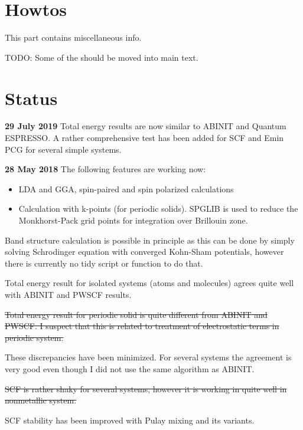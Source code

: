 \documentclass[a4paper,10pt,fleqn]{article}
\begin{document}


















\appendix
\section{Howtos}

This part contains miscellaneous info.

TODO: Some of the should be moved into main text.




\section*{Status}

\textbf{29 July 2019} Total energy results are now similar to ABINIT
and Quantum ESPRESSO. A rather comprehensive test has been added
for SCF and Emin PCG for several simple systems.


\textbf{28 May 2018} The following features are working now:
\begin{itemize}
\item LDA and GGA, spin-paired and spin polarized calculations
\item Calculation with k-points (for periodic solids).
  \textsf{SPGLIB} is used to reduce the Monkhorst-Pack grid points
  for integration over Brillouin zone.
\end{itemize}

Band structure calculation is possible in principle as this can be
done by simply solving
Schrodinger equation with converged Kohn-Sham potentials, however there
is currently no tidy script or function to do that.

Total energy result for isolated systems (atoms and molecules) agrees quite
well with ABINIT and PWSCF results.

\sout{Total energy result for periodic solid is quite different from ABINIT and PWSCF.
I suspect that this is related to treatment of electrostatic terms in periodic system.}

These discrepancies have been minimized. For several systems the agreement is very good
even though I did not use the same algorithm as ABINIT.

\sout{SCF is rather shaky for several systems, however it is working in quite well in nonmetallic
system.}

SCF stability has been improved with Pulay mixing and its variants.





\end{document}
